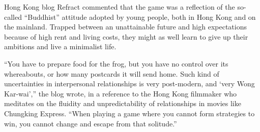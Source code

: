 Hong Kong blog Refract commented that the game was a reflection of the so-called “Buddhist” attitude adopted by young people, both in Hong Kong and on the mainland. Trapped between an unattainable future and high expectations because of high rent and living costs, they might as well learn to give up their ambitions and live a minimalist life.

“You have to prepare food for the frog, but you have no control over its whereabouts, or how many postcards it will send home. Such kind of uncertainties in interpersonal relationships is very post-modern, and ‘very Wong Kar-wai’,” the blog wrote, in a reference to the Hong Kong filmmaker who meditates on the fluidity and unpredictability of relationships in movies like Chungking Express. “When playing a game where you cannot form strategies to win, you cannot change and escape from that solitude.” 